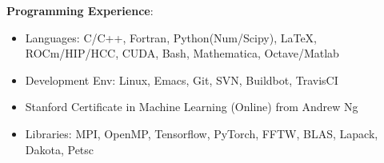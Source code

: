 \blankline

\textbf{Programming Experience}: 
 \begin{itemize}
  \itemsep 0pt
  \item Languages: C/C++, Fortran, Python(Num/Scipy), \LaTeX{}, ROCm/HIP/HCC, CUDA, Bash, Mathematica, Octave/Matlab
  \item Development Env: Linux, Emacs, Git, SVN, Buildbot, TravisCI
  \item Stanford Certificate in Machine Learning (Online) from Andrew Ng
  \item Libraries: MPI, OpenMP, Tensorflow, PyTorch, FFTW, BLAS, Lapack, Dakota, Petsc
 \end{itemize}
